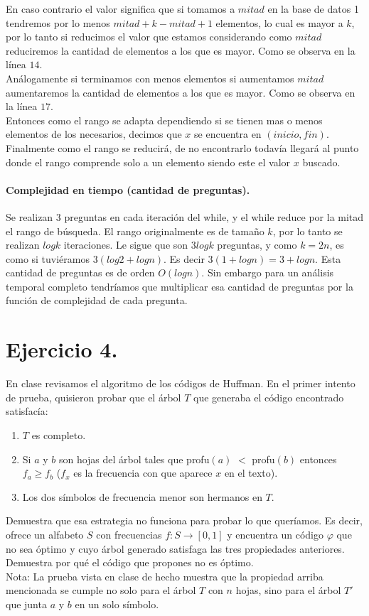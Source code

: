\documentclass[12pt]{article}
\begin{document}
En caso contrario el valor significa que si tomamos a $mitad$ en la base de datos 1 tendremos por lo menos $mitad +k-mitad + 1$ elementos, lo cual es mayor a $k$, por lo tanto si reducimos el valor que estamos considerando como $mitad$ reduciremos la cantidad de elementos a los que es mayor. Como se observa en la línea $14$.\\
Análogamente si terminamos con menos elementos si aumentamos $mitad$ aumentaremos la cantidad de elementos a los que es mayor. Como se observa en la línea $17$.\\
Entonces como el rango se adapta dependiendo si se tienen mas o menos elementos de los necesarios, decimos que $x$ se encuentra en $(inicio,fin)$.\\
Finalmente como el rango se reducirá, de no encontrarlo todavía llegará al punto donde el rango comprende solo a un elemento siendo este el valor $x$ buscado.\\
\paragraph{Complejidad en tiempo (cantidad de preguntas).} Se realizan 3 preguntas en cada iteración del while, y el while reduce por la mitad el rango de búsqueda. El rango originalmente es de tamaño $k$, por lo tanto se realizan $logk$ iteraciones. Le sigue que son $3logk$ preguntas, y como $k=2n$, es como si tuviéramos $3(log2 + logn)$. Es decir $3(1 + logn)=3 + logn$.  Esta cantidad de preguntas es de orden $O(logn)$. Sin embargo para un análisis temporal completo tendríamos que multiplicar esa cantidad de preguntas por la función de complejidad de cada pregunta. 
\section{Ejercicio 4.}
En clase revisamos el algoritmo de los códigos de Huffman. En el primer intento de prueba, quisieron probar que el árbol $T$ que generaba el código encontrado satisfacía:
\begin{enumerate}
	\item  $T$ es completo.
	\item Si $a$ y $b$ son hojas del árbol tales que profu$(a)$ $<$ profu$(b)$ entonces $f_a \geq f_b$ ($f_x$ es la frecuencia con que aparece $x$ en el texto).
	\item Los dos símbolos de frecuencia menor son hermanos en $T$.
\end{enumerate}
Demuestra que esa estrategia no funciona para probar lo que queríamos. Es decir, ofrece un alfabeto $S$ con frecuencias $f:S\rightarrow[0,1]$ y encuentra un código $\varphi$ que no sea óptimo y cuyo árbol generado satisfaga las tres propiedades anteriores. Demuestra por qué el código que propones no es óptimo.\\
Nota: La prueba vista en clase de hecho muestra que la propiedad arriba mencionada se cumple no solo para el árbol $T$ con $n$ hojas, sino para el árbol $T'$ que junta $a$ y $b$ en un solo símbolo. 
\end{document}
